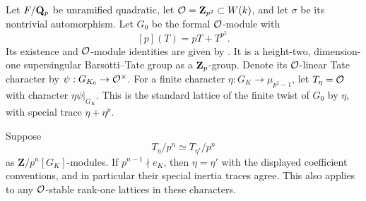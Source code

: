 Let $F/\mathbf Q_p$ be unramified quadratic, let $\mathcal O=\mathbf Z_{p^2}\subset W(k)$,
and let $\sigma$ be its nontrivial automorphism. Let $G_0$ be the formal
$\mathcal O$-module with
\[
 [p](T)=pT+T^{p^2}.
\]
Its existence and $\mathcal O$-module identities are given by
\citet[Lemma 1 and Theorem 1, pp.~381--382]{LT1965}. It is a height-two,
dimension-one supersingular Barsotti--Tate group as a $\mathbf Z_p$-group. Denote its
$\mathcal O$-linear Tate character by $\psi:G_{K_0}\to\mathcal O^\times$.
For a finite character $\eta:G_K\to\mu_{p^2-1}$, let $T_\eta=\mathcal O$ with
character $\eta\psi|_{G_K}$. This is the standard lattice of the finite twist
of $G_0$ by $\eta$, with special trace $\eta+\eta^p$.

\begin{theorem}\label{rc-thm:LT}
Suppose
\[
 T_\eta/p^n\simeq T_{\eta'}/p^n
\]
as $\mathbf Z/p^n[G_K]$-modules. If $p^{n-1}\nmid e_K$, then
$\eta=\eta'$ with the displayed coefficient conventions, and in particular
their special inertia traces agree. This also applies to any $\mathcal O$-stable
rank-one lattices in these characters.
\end{theorem}

